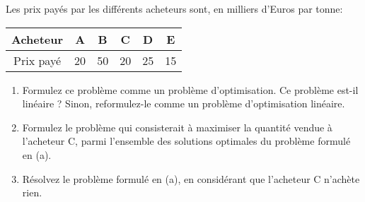 \begin{enumerate}
    Les prix payés par les différents acheteurs sont, en milliers
    d'Euros par tonne:
    \begin{center}
      \begin{tabular}{|c|c|c|c|c|c|}
        \hline %
        Acheteur & A & B & C & D & E\\
        \hline
        Prix payé & 20 & 50 & 20 & 25 & 15 \\
        \hline
      \end{tabular}
    \end{center}

    \begin{enumerate}
      \item  Formulez ce problème comme un problème d'optimisation. Ce
        problème est-il linéaire ? Sinon, reformulez-le comme un problème
        d'optimisation linéaire.

      \item %
        Formulez le problème qui consisterait à maximiser la quantité
        vendue à l'acheteur C, parmi l'ensemble des solutions optimales du
        problème formulé en (a).
      \item  Résolvez le problème formulé en (a), en considérant que
        l'acheteur C n'achète rien.

    \end{enumerate}



\end{enumerate}
